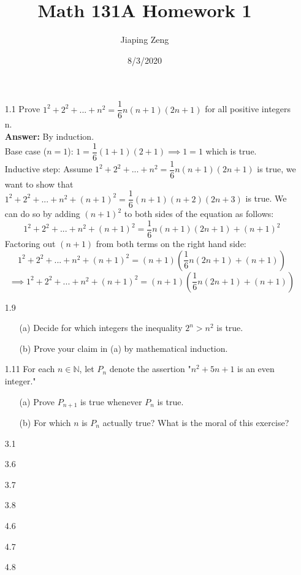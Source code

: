 \documentclass{article}
\title{Math 131A Homework 1}
\date{8/3/2020}
\author{Jiaping Zeng}
\begin{document}
\maketitle

\begin{itemize}
      \item [1.1] Prove $1^2+2^2+...+n^2=\dfrac{1}{6}n(n+1)(2n+1)$ for all positive integers n.\\\textbf{Answer: } By induction. \\
            Base case ($n=1$): $1=\dfrac{1}{6}(1+1)(2+1)\implies1=1$ which is true. \\
            Inductive step: Assume $1^2+2^2+...+n^2=\dfrac{1}{6}n(n+1)(2n+1)$ is true, we want to show that $1^2+2^2+...+n^2+(n+1)^2=\dfrac{1}{6}(n+1)(n+2)(2n+3)$ is true. We can do so by adding $(n+1)^2$ to both sides of the equation as follows:
            \[1^2+2^2+...+n^2+(n+1)^2=\dfrac{1}{6}n(n+1)(2n+1)+(n+1)^2\]
            Factoring out $(n+1)$ from both terms on the right hand side:
            \[1^2+2^2+...+n^2+(n+1)^2=(n+1)(\dfrac{1}{6}n(2n+1)+(n+1))\]
            \[\implies1^2+2^2+...+n^2+(n+1)^2=(n+1)(\dfrac{1}{6}n(2n+1)+(n+1))\]
      \item [1.9]
            \begin{itemize}
                  \item [(a)] Decide for which integers the inequality $2^n>n^2$ is true.
                  \item [(b)] Prove your claim in (a) by mathematical induction.
            \end{itemize}
      \item [1.11] For each $n\in\mathbb{N}$, let $P_n$ denote the assertion "$n^2+5n+1$ is an even integer."
            \begin{itemize}
                  \item [(a)] Prove $P_{n+1}$ is true whenever $P_n$ is true.
                  \item [(b)] For which $n$ is $P_n$ actually true? What is the moral of this exercise?
            \end{itemize}
      \item [3.1]
      \item [3.6]
      \item [3.7]
      \item [3.8]
      \item [4.6]
      \item [4.7]
      \item [4.8]

\end{itemize}
\end{document}
